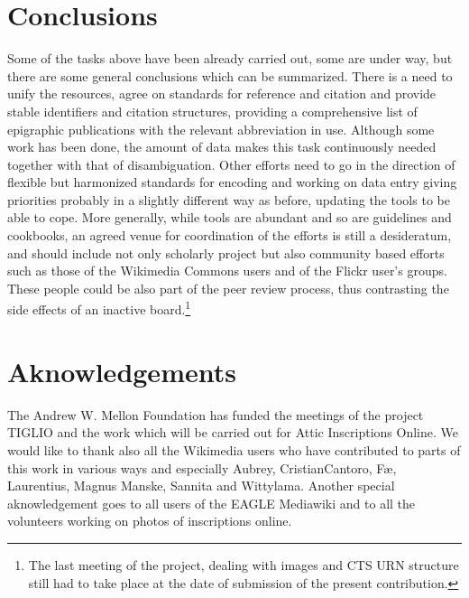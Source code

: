 \documentclass[amsthm,ebook]{saparticle}
\begin{document}
\section{Conclusions}
\noindent Some of the tasks above have been already carried out, some are under way, but there are some general conclusions which can be summarized. There is a need to unify the resources, agree on standards for reference and citation and provide stable identifiers and citation structures, providing a comprehensive list of epigraphic publications with the relevant abbreviation in use. Although some work has been done, the amount of data makes this task continuously needed together with that of disambiguation. Other efforts need to go in the direction of flexible but harmonized standards for encoding and working on data entry giving priorities probably in a  slightly different way as before, updating the tools to be able to cope. More generally, while tools are abundant and so are guidelines and cookbooks, an agreed venue for coordination of the efforts is still a desideratum, and should include not only scholarly project but also community based efforts such as those of the Wikimedia Commons users and of the Flickr user's groups. These people could be also part of the peer review process, thus contrasting the side effects of an inactive board.\footnote{The last meeting of the project, dealing with images and CTS URN structure still had to take place at the date of submission of the present contribution.}

\section*{Aknowledgements}
\noindent The Andrew W. Mellon Foundation has funded the meetings of the project TIGLIO and the work which will be carried out for Attic Inscriptions Online. We would like to thank also all the Wikimedia users who have contributed to parts of this work in various ways and especially Aubrey, CristianCantoro, Fæ, Laurentius, Magnus Manske, Sannita and Wittylama. Another special aknowledgement goes to all users of the EAGLE Mediawiki and to all the volunteers working on photos of inscriptions online.




\end{document}
